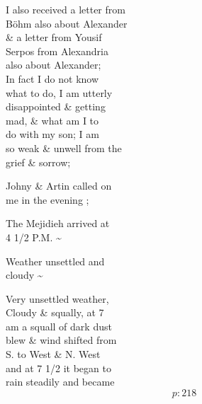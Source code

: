 \documentclass{report}
\begin{document}

	\par{
 	I also received a letter from\ \\Böhm also about Alexander\ \\\& a letter from Yousif\ \\Serpos from Alexandria\ \\also about Alexander;\ \\In fact I do not know\ \\what to do, I am utterly\ \\disappointed \& getting\ \\mad, \& what am I to\ \\do with my son; I am\ \\so weak \& unwell from the\ \\grief \& sorrow;\ \\
	}

	\par{
 	Johny \& Artin called on\ \\me in the evening ;\ \\
	}

	\par{
 	The Mejidieh arrived at\ \\4 1/2 P.M. \~{}\ \\
	}

	\par{
 	Weather unsettled and\ \\cloudy \~{}\ \\
	}

	\par{
 	Very unsettled weather,\ \\Cloudy \& squally, at 7\ \\am a squall of dark dust\ \\blew \& wind shifted from\ \\S. to West \& N. West\ \\and at 7 1/2 it began to\ \\rain steadily and became\ \\
  \[p: 218 \]

	}

	\marginpar{}
\end{document}

